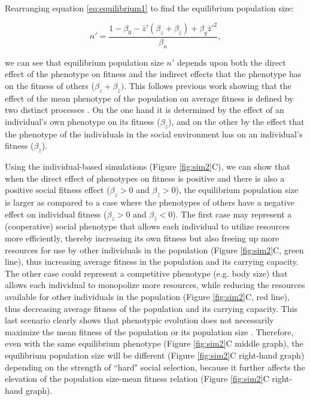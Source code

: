 \documentclass{article}
\begin{document}
\noindent Rearranging equation \ref{eq:equilibrium1} to find the equilibrium population size:
 
\begin{equation}
n' = \frac{1-\beta_{0} - \bar{z}'(\beta_{z} + \beta_{\bar{z}} )+  \beta_{q} \bar{z}'^2}{\beta_{n}},
\end{equation}

\noindent we can see that equilibrium population size $n'$ depends upon both the direct effect of the phenotype on fitness and the indirect effects that the phenotype has on the fitness of others ($\beta_{z} + \beta_{\bar{z}})$. This follows previous work showing that the effect of the mean phenotype of the population on average fitness is defined by two distinct processes \citep{Engen2020, Lande2007, Abrams1993}. On the one hand it is determined by the effect of an individual's own phenotype on its fitness ($\beta_{z}$), and on the other by the effect that the phenotype of the individuals in the social environment has on an individual's fitness ($\beta_{\bar{z}}$).

Using the individual-based simulations (Figure \ref{fig:sim2}C), we can show that when the direct effect of phenotypes on fitness is positive and there is also a positive social fitness effect ($\beta_{z}>0$ and $\beta_{\bar{z}}>0$), the equilibrium population size is larger as compared to a case where the phenotypes of others have a negative effect on individual fitness ($\beta_{z}>0$ and $\beta_{\bar{z}}<0$). The first case may represent a (cooperative) social phenotype that allows each individual to utilize resources more efficiently, thereby increasing its own fitness but also freeing up more resources for use by other individuals in the population (Figure \ref{fig:sim2}C, green line), thus increasing average fitness in the population and its carrying capacity. The other case could represent a competitive phenotype (e.g. body size) that allows each individual to monopolize more resources, while reducing the resources available for other individuals in the population (Figure \ref{fig:sim2}C, red line), thus decreasing average fitness of the population and its carrying capacity. This last scenario clearly shows that phenotypic evolution does not necessarily maximize the mean fitness of the population or its population size \citep{Wright1969, Abrams1993}. Therefore, even with the same equilibrium phenotype (Figure \ref{fig:sim2}C middle graph), the equilibrium population size will be different (Figure \ref{fig:sim2}C right-hand graph) depending on the strength of ``hard" social selection, because it further affects the elevation of the population size-mean fitness relation (Figure \ref{fig:sim2}C right-hand graph).
\end{document}
